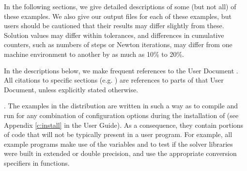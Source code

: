 \vspace{0.2in}\noindent 
In the following sections, we give detailed descriptions of some (but
not all) of these examples.  We also give our output files for
each of these examples, but users should be cautioned that their
results may differ slightly from these.  Solution
values may differ within tolerances, and differences in cumulative
counters, such as numbers of steps or Newton iterations, may differ
from one machine environment to another by as much as 10\% to 20\%.

In the descriptions below, we make frequent references to the {\ida}
User Document \cite{ida_ug}.  All citations to specific sections
(e.g. ) are references to parts of that User Document, unless
explicitly stated otherwise.

\vspace{0.2in}. 
The examples in the {\ida} distribution are written in such a way as
to compile and run for any combination of configuration options during the
installation of {\sundials} (see Appendix \ref{c:install} in the User Guide).
As a consequence, they contain portions of code that will not be typically present in a
user program. For example, all example programs make use of the
variables  and 
to test if the solver libraries were built in extended or double precision,
and use the appropriate conversion specifiers in  functions.
